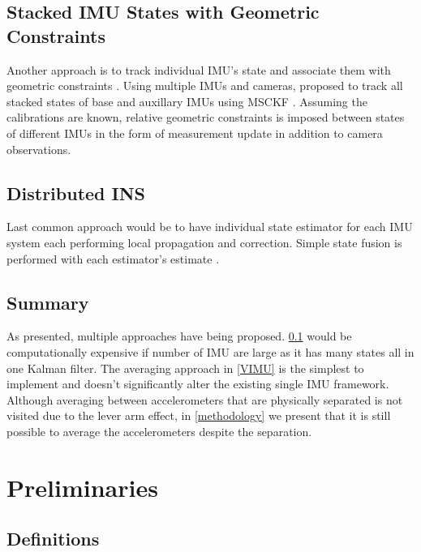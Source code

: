 \documentclass[conference]{IEEEtran}
\begin{document}
\subsection{Stacked IMU States with Geometric Constraints}\label{constraint}

Another approach is to track individual IMU's state and associate them with geometric constraints \cite{waegli2008, Beaudoin2018_satelite}. Using multiple IMUs and cameras, \cite{Eckenhoff2021_MIMC-VINS} proposed to track all stacked states of base and auxillary IMUs using MSCKF \cite{Anastasios2007_MSCKF}. Assuming the calibrations are known, relative geometric constraints is imposed between states of different IMUs in the form of measurement update in addition to camera observations.

\subsection{Distributed INS}\label{distributed}

Last common approach would be to have individual state estimator for each IMU system each performing local propagation and correction. Simple state fusion is performed with each estimator's estimate \cite{Bancroft2011DataFA, patel2022_multi-imu}.

\subsection{Summary}

As presented, multiple approaches have being proposed. \ref{constraint} would be computationally expensive if number of IMU are large as it has many states all in one Kalman filter. The averaging approach in \ref{VIMU} is the simplest to implement and doesn't significantly alter the existing single IMU framework. Although averaging between accelerometers that are physically separated is not visited due to the lever arm effect, in \ref{methodology} we present that it is still possible to average the accelerometers despite the separation.

\section{Preliminaries}

\subsection{Definitions}
\end{document}
